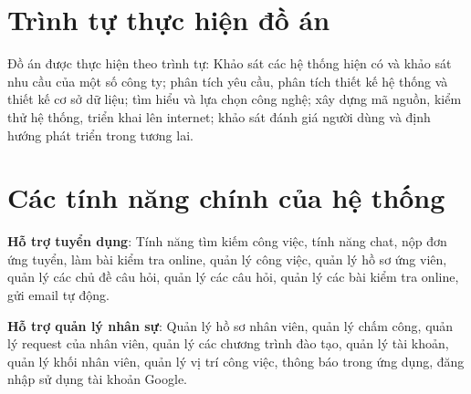 
\raggedbottom

\section{Trình tự thực hiện đồ án}
Đồ án được thực hiện theo trình tự: Khảo sát các hệ thống hiện có và khảo sát nhu cầu của một số công ty; phân tích yêu cầu, phân tích thiết kế hệ thống và thiết kế cơ sở dữ liệu; tìm hiểu và lựa chọn công nghệ; xây dựng mã nguồn, kiểm thử hệ thống, triển khai lên internet; khảo sát đánh giá người dùng và định hướng phát triển trong tương lai.

\section{Các tính năng chính của hệ thống}
\textbf{Hỗ trợ tuyển dụng}: Tính năng tìm kiếm công việc, tính năng chat, nộp đơn ứng tuyển, làm bài kiểm tra online, quản lý công việc, quản lý hồ sơ ứng viên, quản lý các chủ đề câu hỏi, quản lý các câu hỏi, quản lý các bài kiểm tra online, gửi email tự động.

\textbf{Hỗ trợ quản lý nhân sự}: Quản lý hồ sơ nhân viên, quản lý chấm công, quản lý request của nhân viên, quản lý các chương trình đào tạo, quản lý tài khoản, quản lý khối nhân viên, quản lý vị trí công việc, thông báo trong ứng dụng, đăng nhập sử dụng tài khoản Google.

